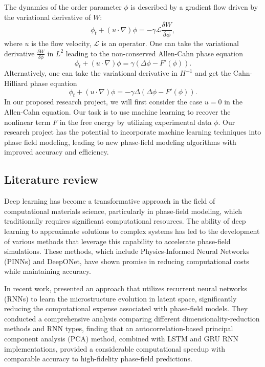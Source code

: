 The dynamics of the order parameter $\phi$ is described by a gradient flow driven by the variational derivative of $W$:
\begin{equation}
    \phi_t + (u \cdot \nabla) \phi = -\gamma \mathcal{L}\frac{\delta W}{\delta \phi},
\end{equation}
where $u$ is the flow velocity, $\mathcal{L}$ is an operator. One can take the variational derivative $\frac{\delta W}{\delta \phi}$ in $L^2$ leading to the non-conserved Allen-Cahn phase equation
\begin{equation}
    \phi_t + (u \cdot \nabla) \phi = \gamma (\Delta \phi - F'( \phi )).
\end{equation}
Alternatively, one can take the variational derivative in $H^{-1}$ and get the Cahn-Hilliard phase equation
\begin{equation}
    \phi_t + (u \cdot \nabla) \phi = -\gamma \Delta (\Delta \phi - F'( \phi )).
\end{equation}
In our proposed research project, we will first consider the case $u = 0$ in the Allen-Cahn equation. Our task is to use machine learning to recover the nonlinear term $F$ in the free energy by utilizing experimental data $\phi$. Our research project has the potential to incorporate machine learning techniques into phase field modeling, leading to new phase-field modeling algorithms with improved accuracy and efficiency.

\subsection{Literature review}
Deep learning has become a transformative approach in the field of computational materials science, particularly in phase-field modeling, which traditionally requires significant computational resources. The ability of deep learning to approximate solutions to complex systems has led to the development of various methods that leverage this capability to accelerate phase-field simulations. These methods, which include Physics-Informed Neural Networks (PINNs) and DeepONet, have shown promise in reducing computational costs while maintaining accuracy.

In recent work, \cite{hu2022accelerating} presented an approach that utilizes recurrent neural networks (RNNs) to learn the microstructure evolution in latent space, significantly reducing the computational expense associated with phase-field models. They conducted a comprehensive analysis comparing different dimensionality-reduction methods and RNN types, finding that an autocorrelation-based principal component analysis (PCA) method, combined with LSTM and GRU RNN implementations, provided a considerable computational speedup with comparable accuracy to high-fidelity phase-field predictions.

